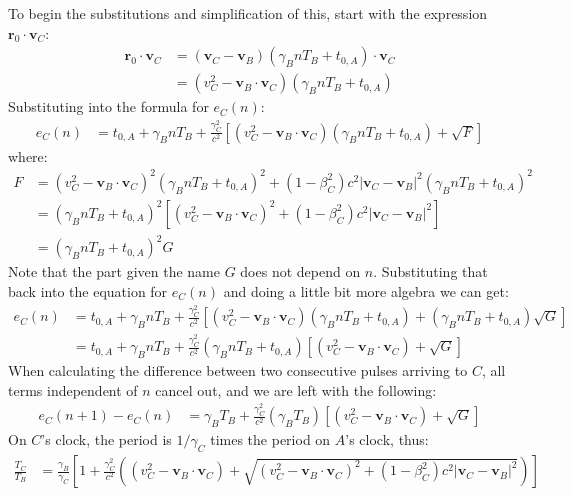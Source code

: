 \documentclass[a4paper]{article}
\theoremstyle{plain}
\theoremstyle{definition}
\newcommand{\vect}[1]{\mathbf{#1}}
\begin{document}
To begin the substitutions and simplification of this, start with the
expression $\vect{r}_0 \cdot \vect{v}_C$:
\begin{align*}
\vect{r}_0 \cdot \vect{v}_C
  & = (\vect{v}_C - \vect{v}_B) (\gamma_B n T_B + t_{0,A}) \cdot \vect{v}_C \\
  & = (v_C^2 - \vect{v}_B \cdot \vect{v}_C) (\gamma_B nT_B + t_{0,A})
\end{align*}
Substituting into the formula for $e_C(n)$:
\begin{align*}
e_{C}(n) & = t_{0,A} + \gamma_B nT_B + \frac{\gamma_C^2}{c^2} \left[ (v_C^2 - \vect{v}_B \cdot \vect{v}_C) (\gamma_B nT_B + t_{0,A}) + \sqrt{F} \right]
\end{align*}
where:
\begin{align*}
F & = (v_C^2 - \vect{v}_B \cdot \vect{v}_C)^2 (\gamma_B nT_B + t_{0,A})^2 + (1-\beta_C^2)c^2 |\vect{v}_C - \vect{v}_B|^2 (\gamma_B nT_B + t_{0,A})^2 \\
  & = (\gamma_B nT_B + t_{0,A})^2 \left[ (v_C^2 - \vect{v}_B \cdot \vect{v}_C)^2  + (1-\beta_C^2)c^2 |\vect{v}_C - \vect{v}_B|^2 \right] \\
  & = (\gamma_B nT_B + t_{0,A})^2 G
\end{align*}
Note that the part given the name $G$ does not depend on $n$.
Substituting that back into the equation for $e_C(n)$ and doing a little
bit more algebra we can get:
\begin{align*}
e_{C}(n)
  & = t_{0,A} + \gamma_B nT_B + \frac{\gamma_C^2}{c^2} \left[ (v_C^2 - \vect{v}_B \cdot \vect{v}_C) (\gamma_B nT_B + t_{0,A}) + (\gamma_B nT_B + t_{0,A}) \sqrt{G} \right] \\
  & = t_{0,A} + \gamma_B nT_B + \frac{\gamma_C^2}{c^2} (\gamma_B nT_B + t_{0,A}) \left[ (v_C^2 - \vect{v}_B \cdot \vect{v}_C) + \sqrt{G} \right]
\end{align*}
When calculating the difference between two consecutive pulses
arriving to $C$, all terms independent of $n$ cancel out, and we are
left with the following:
\begin{align*}
e_{C}(n+1) - e_{C}(n)
  & = \gamma_B T_B + \frac{\gamma_C^2}{c^2} (\gamma_B T_B) \left[ (v_C^2 - \vect{v}_B \cdot \vect{v}_C) + \sqrt{G} \right]
\end{align*}
On $C$'s clock, the period is $1/\gamma_C$ times the period on $A$'s
clock, thus:
\begin{align}
\frac{T_C}{T_B}
  & = \frac{\gamma_B}{\gamma_C} \left[ 1 + \frac{\gamma_C^2}{c^2} \left( (v_C^2 - \vect{v}_B \cdot \vect{v}_C) + \sqrt{(v_C^2 - \vect{v}_B \cdot \vect{v}_C)^2  + (1-\beta_C^2)c^2 |\vect{v}_C - \vect{v}_B|^2} \right) \right] \label{eqn:scen1c-TC}
\end{align}
\end{document}
